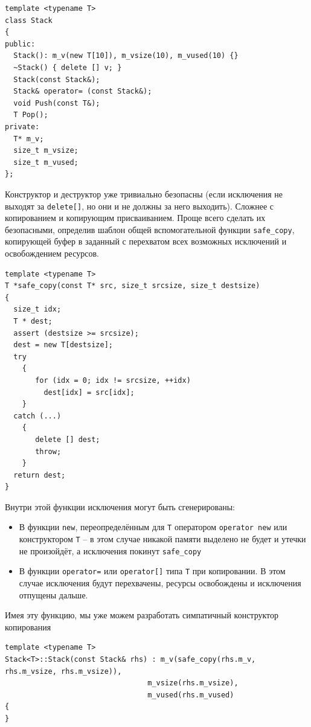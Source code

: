 \documentclass[a4paper,12pt,oneside]{article}
\begin{document}
\begin{lstlisting}
template <typename T> 
class Stack
{
public:
  Stack(): m_v(new T[10]), m_vsize(10), m_vused(10) {}
  ~Stack() { delete [] v; }
  Stack(const Stack&);
  Stack& operator= (const Stack&);
  void Push(const T&);
  T Pop();
private:
  T* m_v;
  size_t m_vsize;
  size_t m_vused;
};
\end{lstlisting}

Конструктор и деструктор уже тривиально безопасны (если исключения не выходят за \lstinline!delete[]!, но они и не должны за него выходить). Сложнее с копированием и копирующим присваиванием. Проще всего сделать их безопасными, определив шаблон общей вспомогательной функции \lstinline!safe_copy!, копирующей буфер в заданный с перехватом всех возможных исключений и освобождением ресурсов.

\begin{lstlisting}
template <typename T>
T *safe_copy(const T* src, size_t srcsize, size_t destsize)
{
  size_t idx;
  T * dest;
  assert (destsize >= srcsize);
  dest = new T[destsize];
  try 
    {
       for (idx = 0; idx != srcsize, ++idx)
         dest[idx] = src[idx];
    }
  catch (...)
    {
       delete [] dest;
       throw;
    }
  return dest;
}
\end{lstlisting}

Внутри этой функции исключения могут быть сгенерированы:

\begin{itemize}
\item
В функции \lstinline!new!, переопределённым для \lstinline!T! оператором \lstinline!operator new! или конструктором  \lstinline!T! -- в этом случае никакой памяти выделено не будет и утечки не произойдёт, а исключения покинут  \lstinline!safe_copy!
\item
В функции  \lstinline!operator=! или  \lstinline!operator[]! типа  \lstinline!T! при копировании. В этом случае исключения будут перехвачены, ресурсы освобождены и исключения отпущены дальше.
\end{itemize}

Имея эту функцию, мы уже можем разработать симпатичный конструктор копирования

\begin{lstlisting}
template <typename T>
Stack<T>::Stack(const Stack& rhs) : m_v(safe_copy(rhs.m_v, rhs.m_vsize, rhs.m_vsize)), 
                                 m_vsize(rhs.m_vsize), 
                                 m_vused(rhs.m_vused) 
{
}
\end{lstlisting}
\end{document}
